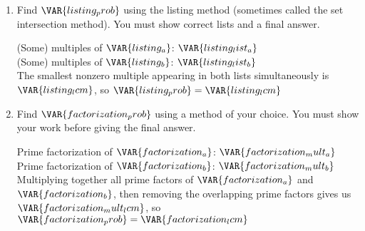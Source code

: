 
\begin{enumerate}

    \item Find $\VAR{listing_prob}$ using the listing method (sometimes called the set intersection method). You must show correct lists and a final answer.

    \vfill

    \begin{ansenv}
        (Some) multiples of $\VAR{listing_a}$: $\VAR{listing_list_a}$\\

        (Some) multiples of $\VAR{listing_b}$: $\VAR{listing_list_b}$\\

        The smallest nonzero multiple appearing in both lists simultaneously is $\VAR{listing_lcm}$, so $\VAR{listing_prob} = \VAR{listing_lcm}$
    \end{ansenv}

    \vfill

    \item Find $\VAR{factorization_prob}$ using a method of your choice. You must show your work before giving the final answer.

    \vfill

    \begin{ansenv}
        Prime factorization of $\VAR{factorization_a}$: $\VAR{factorization_mult_a}$\\

        Prime factorization of $\VAR{factorization_b}$: $\VAR{factorization_mult_b}$\\

        Multiplying together all prime factors of $\VAR{factorization_a}$ and $\VAR{factorization_b}$, then removing the overlapping prime factors gives us $\VAR{factorization_mult_lcm}$, so $\VAR{factorization_prob} = \VAR{factorization_lcm}$
    \end{ansenv}

    \vfill

\end{enumerate}

\trueemptypage